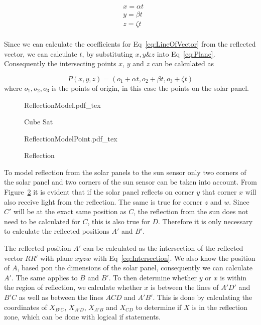 \documentclass[letterpaper, 10 pt, conference]{ieeeconf}  %
\begin{document}
\begin{equation}
	\begin{aligned}
	&	x = \alpha t \\
	&	y = \beta t \\
	&	z = \zeta t \\
	\end{aligned}
\label{eq:LineOfVector}
\end{equation}

Since we can calculate the coefficients for Eq~\ref{eq:LineOfVector} from the reflected vector, we can calculate $t$, by substituting $x, y \& z$ into Eq~\ref{eq:Plane}. Consequently the intersecting points $x$, $y$ and $z$ can be calculated as

\begin{equation}
	P(x, y, z) = (o_1 + \alpha t, o_2 + \beta t, o_3 + \zeta t)
	\label{eq:Intersection}
\end{equation}
where $o_1, o_2, o_3$ is the points of origin, in this case the points on the solar panel.

\begin{figure}[!htb]
	\centering
	\def\svgwidth{7cm}
	{ReflectionModel.pdf_tex}
	\caption{Cube Sat}
	\label{fig:CubeSat}
\end{figure}

\begin{figure}[!htb]
	\centering
	\def\svgwidth{7cm}
	{ReflectionModelPoint.pdf_tex}
	\caption{Reflection}
	\label{fig:ReflectionPoints}
\end{figure}

To model reflection from the solar panels to the sun sensor only two corners of the solar panel and two corners of the sun sensor can be taken into account. From Figure~\ref{fig:ReflectionPoints} it is evident that if the solar panel reflects on corner $y$ that corner $x$ will also receive light from the reflection. The same is true for corner $z$ and $w$. Since $C'$ will be at the exact same position as $C$, the reflection from the sun does not need to be calculated for $C$, this is also true for $D$. Therefore it is only necessary to calculate the reflected positions $A'$ and $B'$.

The reflected position $A'$ can be calculated as the intersection of the reflected vector $RR'$ with plane $xyzw$ with Eq~\ref{eq:Intersection}. We also know the position of $A$, based pon the dimensions of the solar panel, consequently we can calculate $A'$. The same applies to $B$ and $B'$. To then determine whether $y$ or $x$ is within the region of reflection, we calculate whether $x$ is between the lines of $A'D'$ and $B'C$ as well as between the lines $ACD$ and $A'B'$. This is done by calculating the coordinates of $X_{B'C}$, $X_{A'D}$, $X_{A'B}$ and $X_{CD}$ to determine if $X$ is in the reflection zone, which can be done with logical if statements.
\end{document}
